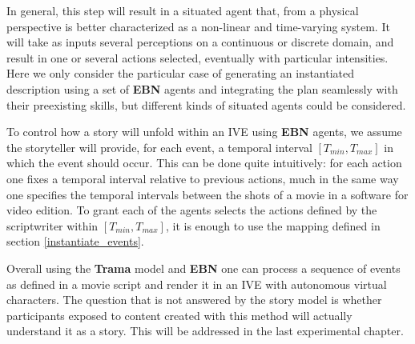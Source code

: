 \documentclass[
		twoside,openright,titlepage,numbers=noenddot,manychapters,
		headinclude,%
                footinclude=false,cleardoublepage=empty,
                BCOR=5mm,
		fontsize=11pt, %
                 enabledeprecatedfontcommands]{scrreprt}
\begin{document}
In general, this step will result in a situated agent that, from a physical perspective is better characterized as a non-linear and time-varying system. It will take as inputs several perceptions on a continuous or discrete domain, and result in one or several actions selected, eventually with particular intensities. %
Here we only consider the particular case of generating an instantiated description using a set of \textbf{EBN} agents and integrating the plan seamlessly with their preexisting skills, but different kinds of situated agents could be considered. 

To control how a story will unfold within an IVE using \textbf{EBN} agents, we assume the storyteller will provide, for each event, a temporal interval $[T_{min}, T_{max}]$ in which the event should occur. This can be done quite intuitively: for each action one fixes a temporal interval relative to previous actions, much in the same way one specifies the temporal intervals between the shots of a movie in a software for video edition. %
 To grant each of the agents selects the actions defined by the scriptwriter within $[T_{min}, T_{max}]$, it is enough to use the mapping defined in section \ref{instantiate_events}.

Overall using the \textbf{Trama} model and \textbf{EBN} one can process a sequence of events as defined in a movie script and render it in an IVE with autonomous virtual characters. The question that is not answered by the story model is whether participants exposed to content created with this method will actually understand it as a story. This will be addressed in the last experimental chapter.
\end{document}
